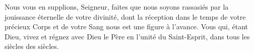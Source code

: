 Nous vous en supplions, Seigneur, faites que nous soyons rassasiés par la jouissance éternelle de votre divinité, dont la réception dans le temps de votre précieux Corps et de votre Sang nous est une figure à l’avance. Vous qui, étant Dieu, vivez et régnez avec Dieu le Père en l'unité du Saint-Esprit, dans tous les siècles des siècles.
